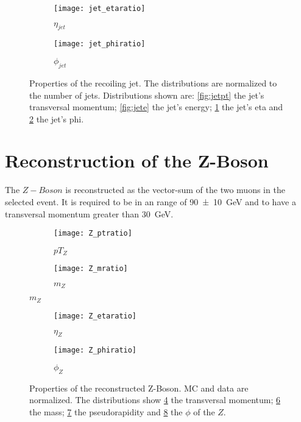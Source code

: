 \begin{figure}[h]
\centering
\begin{subfigure}[b]{0.5\figwidth}
\texttt{[image: jet\_etaratio]}
\caption[$\eta$ of the recoiling jet]{$\eta_{jet}$}
\label{fig:jeteta}
\end{subfigure}
\quad
\begin{subfigure}[b]{0.5\figwidth}
\texttt{[image: jet\_phiratio]}
\caption[$\phi$ of the recoiling jet]{$\phi_{jet}$}
\label{fig:jetphi}
\end{subfigure}
\caption{Properties of the recoiling jet. The distributions are normalized to the number of jets. Distributions shown are: \ref{fig:jetpt} the jet's transversal momentum; \ref{fig:jete} the jet's energy; \ref{fig:jeteta} the jet's eta and \ref{fig:jetphi} the jet's phi.}
\label{fig:reoilingjet}
\end{figure}

\section{Reconstruction of the Z-Boson}

The $Z-Boson$ is reconstructed as the vector-sum of the two muons in the selected event.
It is required to be in an range of \SI{90+-10}{\GeV} and to have a transversal momentum greater than \SI{30}{\GeV}.


\begin{figure}[h]
\centering
\begin{subfigure}[b]{0.5\figwidth}
\texttt{[image: Z\_ptratio]}
\caption[Transversal momentum of the reconstructed Z]{$pT_Z$}
\label{fig:zpt}
\end{subfigure}
\quad
\begin{subfigure}[b]{0.5\figwidth}
\texttt{[image: Z\_mratio]}
\caption[mass of the reconstructed $Z$]{$m_Z$}
\label{fig:zm}
\end{subfigure}
\end{figure}


\begin{figure}[h]
\centering
\begin{subfigure}[b]{0.5\figwidth}
\texttt{[image: Z\_etaratio]}
\caption[$\eta$ of the reconstructed $Z$]{$\eta_Z$}
\label{fig:zeta}
\end{subfigure}
\quad
\begin{subfigure}[b]{0.5\figwidth}
\texttt{[image: Z\_phiratio]}
\caption[$\phi$ of the reconstructed $Z$]{$\phi_Z$}
\label{fig:zphi}
\end{subfigure}
\caption{Properties of the reconstructed Z-Boson. MC and data are normalized. The distributions show \ref{fig:zpt} the transversal momentum; \ref{fig:zm} the mass; \ref{fig:zeta} the pseudorapidity and \ref{fig:zphi} the $\phi$ of the $Z$.}
\label{fig:z}
\end{figure}



